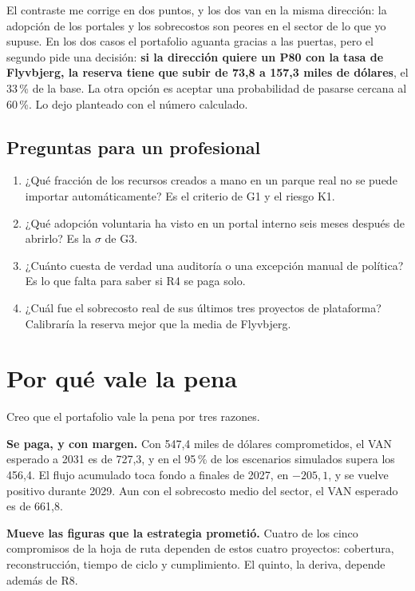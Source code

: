 \documentclass[11pt,letterpaper]{article}
\newcommand{\pct}{\,\%}
\begin{document}
El contraste me corrige en dos puntos, y los dos van en la misma dirección: la
adopción de los portales y los sobrecostos son peores en el sector de lo que yo
supuse. En los dos casos el portafolio aguanta gracias a las puertas, pero el
segundo pide una decisión: \textbf{si la dirección quiere un P80 con la tasa de
Flyvbjerg, la reserva tiene que subir de 73,8 a 157,3 miles de dólares}, el
33\pct{} de la base. La otra opción es aceptar una probabilidad de pasarse
cercana al 60\pct. Lo dejo planteado con el número calculado.

\subsection*{Preguntas para un profesional}

\begin{enumerate}
\item ¿Qué fracción de los recursos creados a mano en un parque real no se
  puede importar automáticamente? Es el criterio de G1 y el riesgo K1.
\item ¿Qué adopción voluntaria ha visto en un portal interno seis meses después
  de abrirlo? Es la $\sigma$ de G3.
\item ¿Cuánto cuesta de verdad una auditoría o una excepción manual de
  política? Es lo que falta para saber si R4 se paga solo.
\item ¿Cuál fue el sobrecosto real de sus últimos tres proyectos de plataforma?
  Calibraría la reserva mejor que la media de Flyvbjerg.
\end{enumerate}

\section{Por qué vale la pena}
\label{sec:porque}

Creo que el portafolio vale la pena por tres razones.

\textbf{Se paga, y con margen.} Con 547,4 miles de dólares comprometidos, el VAN
esperado a 2031 es de 727,3, y en el 95\pct{} de los escenarios simulados
supera los 456,4. El flujo acumulado toca fondo a finales de 2027, en $-205{,}1$,
y se vuelve positivo durante 2029. Aun con el sobrecosto medio del sector, el
VAN esperado es de 661,8.

\textbf{Mueve las figuras que la estrategia prometió.} Cuatro de los cinco
compromisos de la hoja de ruta dependen de estos cuatro proyectos: cobertura,
reconstrucción, tiempo de ciclo y cumplimiento. El quinto, la deriva, depende
además de R8.
\end{document}
